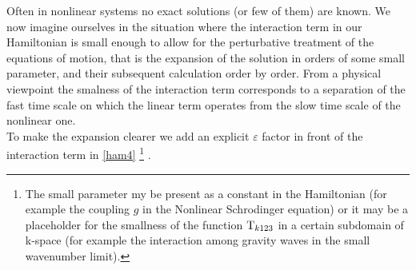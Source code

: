 Often in nonlinear systems no exact solutions (or few of them) are known. We now imagine ourselves in the situation where the interaction term in our Hamiltonian 
is small enough to allow for the perturbative treatment of the equations of motion, that is the expansion of the solution in orders of some small parameter, 
and their subsequent calculation order by order. From a physical viewpoint the smalness of the interaction term corresponds to a 
separation of the fast time scale on which the linear term operates from the slow time scale of the nonlinear one.\\
 To make the expansion clearer we add an explicit $\varepsilon$ factor in front of the interaction term in \eqref{ham4}
\footnote{The small parameter my be present as a constant in the Hamiltonian (for example the coupling $g$ in the Nonlinear Schrodinger equation) or 
it may be a placeholder for the smallness of the function $\mathrm{T}_{k123}$ in a certain subdomain of k-space (for example the interaction among gravity waves in 
the small wavenumber limit). } . \\

